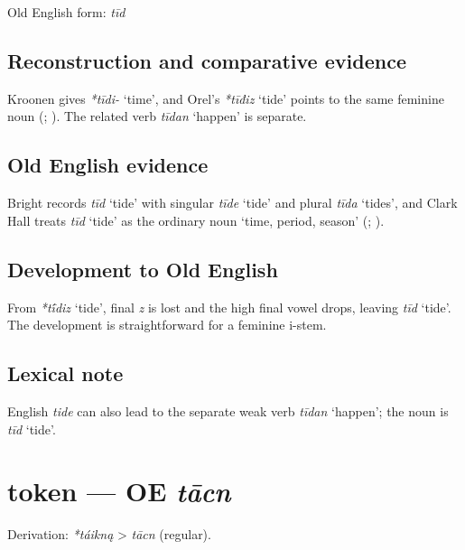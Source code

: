 \documentclass[
  british,
  a4paper,
  openany]{book}
\providecommand{\Recon}[1]{\emph{*#1}}
{\catcode`→=\active \global\def→{\ensuremath{\rightarrow}}}
\providecommand{\texorpdfstring}[2]{#1}
\providecommand{\Recon}[1]{\emph{*#1}}
{\catcode`→=\active \global\def→{\ensuremath{\rightarrow}}}
\begin{document}
Old English form: \emph{tīd}

\subsection{Reconstruction and comparative
evidence}\label{reconstruction-and-comparative-evidence-57}

Kroonen gives \emph{*tīdi-} `time', and Orel's \Recon{tīđiz} `tide'
points to the same feminine noun (; ). The related verb
\emph{tīdan} `happen' is separate.

\subsection{Old English evidence}\label{old-english-evidence-57}

Bright records \emph{tīd} `tide' with singular \emph{tīde} `tide' and
plural \emph{tīda} `tides', and Clark Hall treats \emph{tīd} `tide' as
the ordinary noun `time, period, season'
(;
).

\subsection{Development to Old
English}\label{development-to-old-english-57}

From \Recon{tī́diz} `tide', final \emph{z} is lost and the high final
vowel drops, leaving \emph{tīd} `tide'. The development is
straightforward for a feminine i-stem.

\subsection{Lexical note}\label{lexical-note-1}

English \emph{tide} can also lead to the separate weak verb \emph{tīdan}
`happen'; the noun is \emph{tīd} `tide'.

\section{\texorpdfstring{token --- OE
\emph{tācn}}{token --- OE tācn}}\label{token-oe-tux101cn}


Derivation: \emph{*táikną} \textgreater{} \emph{tācn} (regular).
\end{document}
